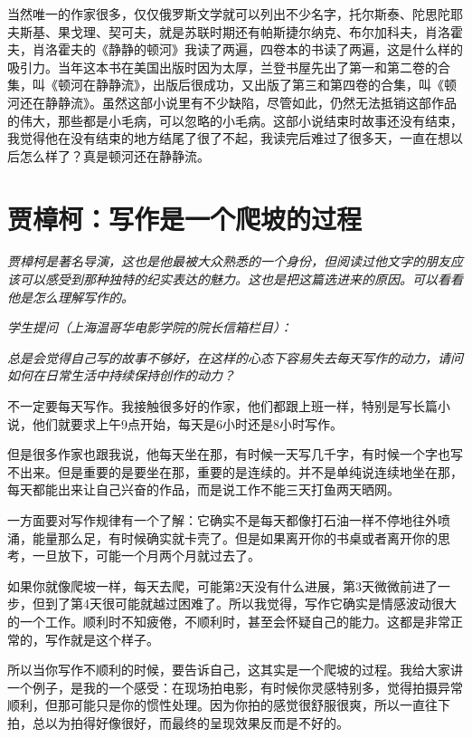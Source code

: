 \documentclass[fontset=fandol,12pt,a5paper]{ctexbook}
\begin{document}
当然唯一的作家很多，仅仅俄罗斯文学就可以列出不少名字，托尔斯泰、陀思陀耶夫斯基、果戈理、契可夫，就是苏联时期还有帕斯捷尔纳克、布尔加科夫，肖洛霍夫，肖洛霍夫的《静静的顿河》我读了两遍，四卷本的书读了两遍，这是什么样的吸引力。当年这本书在美国出版时因为太厚，兰登书屋先出了第一和第二卷的合集，叫《顿河在静静流》，出版后很成功，又出版了第三和第四卷的合集，叫《顿河还在静静流》。虽然这部小说里有不少缺陷，尽管如此，仍然无法抵销这部作品的伟大，那些都是小毛病，可以忽略的小毛病。这部小说结束时故事还没有结束，我觉得他在没有结束的地方结尾了很了不起，我读完后难过了很多天，一直在想以后怎么样了？真是顿河还在静静流。


\newpage

\section{贾樟柯：写作是一个爬坡的过程}

\emph{贾樟柯是著名导演，这也是他最被大众熟悉的一个身份，但阅读过他文字的朋友应该可以感受到那种独特的纪实表达的魅力。这也是把这篇选进来的原因。可以看看他是怎么理解写作的。}
\vspace{2em}


\emph{学生提问（上海温哥华电影学院的院长信箱栏目）：}

\emph{总是会觉得自己写的故事不够好，‍‍在这样的心态下容易失去每天写作的动力，请问如何在日常生活中持续保持创作的动力？}

\vspace{2em}

不一定要每天写作。我接触很多好的作家，他们都跟上班一样，特别是写长篇小说，他们就要求上午9点开始，每天是6小时还是8小时写作。

但是很多作家也跟我说，他每天坐在那，有时候一天写几千字，有时候一个字也写不出来。但是重要的是要坐在那，‍‍重要的是连续的。并不是单纯说连续地坐在那，每天都能出来让自己兴奋的作品，而是说工作不能三天打鱼两天晒网。

一方面要对写作规律有一个了解：它确实不是每天‍‍都像打石油一样不停地往外喷涌，能量那么足，‍‍有时候确实就卡壳了。但是如果离开你的书桌或者离开你的思考，一旦放下，可能‍‍一个月两个月就过去了。

如果你就像爬坡一样，每天去爬，‍‍可能第2天没有什么进展，第3天微微前进了一步，但到了第4天很可能就越过困难了。‍‍所以我觉得，写作它确实是情感波动很大的‍‍一个工作。顺利时不知疲倦，不顺利时，甚至会怀疑自己的能力。这都是非常正常的，写作就是这个样子。

所以当你写作‍‍不顺利的时候，‍‍要告诉自己，这其实是一个爬坡的过程。我给大家讲一个例子，是我的一个感受：在现场拍电影‍‍，有时候你灵感特别多，觉得拍摄异常顺利，但那可能只是你的惯性处理。因为你拍的感觉很舒服很爽，所以一直往下拍，总以为拍得好像很好，而最终的呈现效果反而是不好的。
\end{document}
